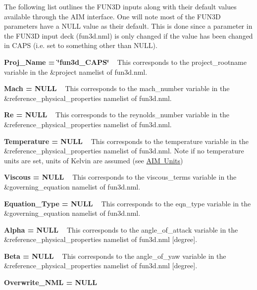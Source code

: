 The following list outlines the FUN3D inputs along with their default values available through the AIM interface. One will note most of the FUN3D parameters have a NULL value as their default. This is done since a parameter in the FUN3D input deck (fun3d.\+nml) is only changed if the value has been changed in CAPS (i.\+e. set to something other than NULL).


\begin{DoxyItemize}
\item {\bfseries{ Proj\+\_\+\+Name = \char`\"{}fun3d\+\_\+\+CAPS\char`\"{}}} ~\newline
 This corresponds to the project\+\_\+rootname variable in the \&project namelist of fun3d.\+nml.
\item {\bfseries{ Mach = NULL }} ~\newline
 This corresponds to the mach\+\_\+number variable in the \&reference\+\_\+physical\+\_\+properties namelist of fun3d.\+nml.
\item {\bfseries{ Re = NULL }} ~\newline
 This corresponds to the reynolds\+\_\+number variable in the \&reference\+\_\+physical\+\_\+properties namelist of fun3d.\+nml.
\item {\bfseries{ Temperature = NULL }} ~\newline
 This corresponds to the temperature variable in the \&reference\+\_\+physical\+\_\+properties namelist of fun3d.\+nml. Note if no temperature units are set, units of Kelvin are assumed (see \mbox{\hyperlink{aimUnitsFUN3D}{AIM Units}})
\item {\bfseries{ Viscous = NULL }} ~\newline
 This corresponds to the viscous\+\_\+terms variable in the \&governing\+\_\+equation namelist of fun3d.\+nml.
\item {\bfseries{ Equation\+\_\+\+Type = NULL }} ~\newline
 This corresponds to the eqn\+\_\+type variable in the \&governing\+\_\+equation namelist of fun3d.\+nml.
\item {\bfseries{ Alpha = NULL }} ~\newline
 This corresponds to the angle\+\_\+of\+\_\+attack variable in the \&reference\+\_\+physical\+\_\+properties namelist of fun3d.\+nml \mbox{[}degree\mbox{]}.
\item {\bfseries{ Beta = NULL }} ~\newline
 This corresponds to the angle\+\_\+of\+\_\+yaw variable in the \&reference\+\_\+physical\+\_\+properties namelist of fun3d.\+nml \mbox{[}degree\mbox{]}.
\item {\bfseries{ Overwrite\+\_\+\+NML = NULL}} ~\newline


\end{DoxyItemize}
